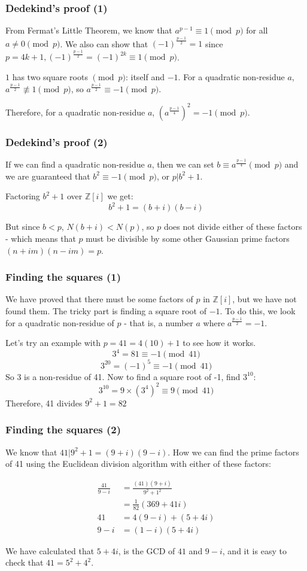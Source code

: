 \documentclass{beamer}
\begin{document}
\begin{frame}
	\frametitle{Dedekind's proof (1)}

	From Fermat's Little Theorem, we know that $a^{p-1} \equiv 1 \pmod{p}$ for all
	$a\neq 0 \pmod{p}$. We also can show that $(-1)^{\frac{p-1}{2}} = 1$ since 
	$p = 4k+1, (-1)^{\frac{p-1}{2}} = (-1)^{2k} \equiv 1 \pmod{p}$.

	$1$ has two square roots $\pmod{p}$: itself and $-1$. For a quadratic non-residue $a$,
	$a^{\frac{p-1}{2}} \not \equiv 1 \pmod{p}$, so $a^{\frac{p-1}{2}} \equiv -1 \pmod{p}$.

	Therefore, for a quadratic non-residue $a$, $(a^{\frac{p-1}{4}})^2 = -1 \pmod{p}$.

\end{frame}
\begin{frame}
	\frametitle{Dedekind's proof (2)}

	If we can find a quadratic non-residue $a$, then we can set $b \equiv a^{\frac{p-1}{4}} \pmod{p}$
	and we are guaranteed that $b^2 \equiv -1 \pmod{p}$, or $p | b^2+1$.

	Factoring $b^2+1$ over $\mathbb{Z}[i]$ we get:
	\[b^2 + 1 = (b+i)(b-i) \]
	
	But since $b<p$, $N(b+i)<N(p)$, so $p$ does not divide either of these factors - which means
	that $p$ must be divisible by some other Gaussian prime factors $(n+im)(n-im) = p$.
\end{frame}

\begin{frame}
	\frametitle{Finding the squares (1)}

	We have proved that there must be some factors of $p$ in $\mathbb{Z}[i]$, but we
	have not found them. The tricky part is finding a square root of $-1$. To do this,
	we look for a quadratic non-residue of $p$ - that is, a number $a$ where 
	$a^{\frac{p-1}{2}} = -1$. 

	Let's try an example with $p=41 = 4(10)+1$ to see how it works.
	\[ 3^4 = 81 \equiv -1 \pmod{41} \]
	\[ 3^{20} = (-1)^5 \equiv -1 \pmod{41} \]
	So 3 is a non-residue of 41. Now to find a square root of -1, find $3^{10}$:
	\[ 3^{10} = 9\times(3^4)^2 \equiv 9 \pmod{41} \]
	Therefore, 41 divides $9^2 + 1 = 82$
\end{frame}

\begin{frame}
	\frametitle{Finding the squares (2)}

	We know that $41|9^2+1 = (9+i)(9-i)$. How we can find the prime factors of 41
	using the Euclidean division algorithm with either of these factors:

	\begin{align*}
		\frac{41}{9-i} &= \frac{(41)(9+i)}{9^2+1^2} \\
		 &= \frac{1}{82}(369 + 41i) \\
		41  &= 4(9-i) + (5+4i) \\
		9-i &= (1-i)(5+4i)
	\end{align*}

	We have calculated that $5+4i$, is the GCD of $41$ and $9-i$, and it is easy to
	check that $41 = 5^2 + 4^2$.

\end{frame}
\end{document}
